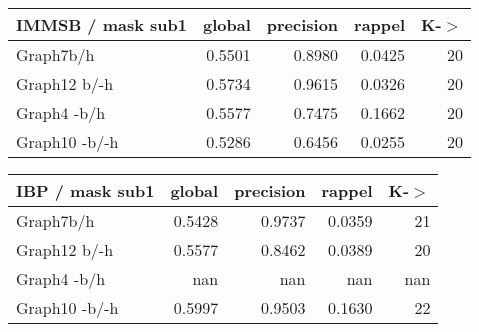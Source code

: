 \begin{table*} 
    \caption{K = 20}
	\begin{minipage}[h]{0.45\linewidth} 
\begin{tabular}{lrrrr}
\hline
 IMMSB / mask sub1   &   global &   precision &   rappel &     K-\ensuremath{>} \\
\hline
 Graph7b/h           &   0.5501 &      0.8980 &   0.0425 & 20 \\
 Graph12 b/-h        &   0.5734 &      0.9615 &   0.0326 & 20 \\
 Graph4 -b/h         &   0.5577 &      0.7475 &   0.1662 & 20 \\
 Graph10 -b/-h       &   0.5286 &      0.6456 &   0.0255 & 20 \\
\hline
\end{tabular}
\end{minipage}
\hspace{0.5cm}
\begin{minipage}[h]{0.45\linewidth}
\begin{tabular}{lrrrr}
\hline
 IBP / mask sub1   &   global &   precision &   rappel &      K-\ensuremath{>} \\
\hline
 Graph7b/h         &   0.5428 &      0.9737 &   0.0359 &  21 \\
 Graph12 b/-h      &   0.5577 &      0.8462 &   0.0389 &  20 \\
 Graph4 -b/h       & nan      &    nan      & nan      & nan      \\
 Graph10 -b/-h     &   0.5997 &      0.9503 &   0.1630 &  22 \\
\hline
\end{tabular}
\end{minipage}
\end{table*}

